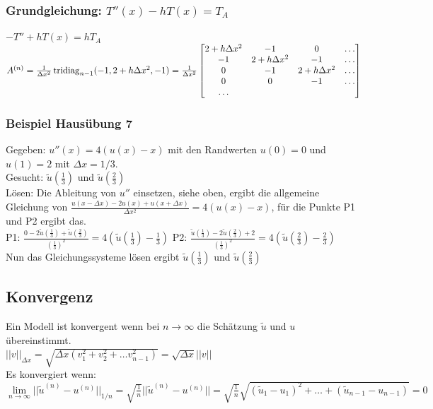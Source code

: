 \subsubsection{Grundgleichung: $T''(x) -  h T(x) = T_A$}
$-T'' + h T(x) = h T_A$\\
$A^{(n)}= \frac{1}{\Delta x^2} \operatorname{tridiag}_{n-1}
(-1,2+h\Delta x^2,-1) = \frac{1}{\Delta x^2}
  \begin{bmatrix}
             2+h\Delta x^2& -1 & 0 & \ldots \\
             -1& 2+h\Delta x^2 & -1 & \ldots \\
              0& -1 & 2+h\Delta x^2 & \ldots \\
              0& 0 & -1 & \ldots \\
             \ldots
           \end{bmatrix} $\\

\subsubsection{Beispiel Hausübung 7}
Gegeben: $ u''(x)=4(u(x)-x) $ mit den Randwerten $ u(0)=0 $  und $ u(1)=2 $ mit $\Delta x=1/3$.
\\
Gesucht: $ \tilde{u}(\frac{1}{3}) $ und $ \tilde{u}(\frac{2}{3}) $
\\
Lösen: Die Ableitung von $ u'' $ einsetzen, siehe oben, ergibt die allgemeine Gleichung von $ \frac{u(x-\Delta x)-2 u(x) + u(x+ \Delta x)}{\Delta x^2} =4 (u(x)-x) $, für die Punkte P1 und P2 ergibt das.
\\
P1: $ \frac{0-2 \tilde{u}(\frac{1}{3}) + \tilde{u}(\frac{2}{3})}{(\frac{1}{3})^2} =4(\tilde{u}(\frac{1}{3})-\frac{1}{3}) $
\qquad \qquad
P2: $ \frac{\tilde{u}(\frac{1}{3})-2 \tilde{u}(\frac{2}{3}) + 2}{(\frac{1}{3})^2} =4(\tilde{u}(\frac{2}{3})-\frac{2}{3}) $
\\
Nun das Gleichungssysteme lösen ergibt $ \tilde{u}(\frac{1}{3}) $ und $ \tilde{u}(\frac{2}{3}) $


\subsection{Konvergenz}
Ein Modell ist konvergent wenn bei $n\rightarrow\infty$ die Schätzung $\tilde{u}$ und $u$ übereinstimmt.\\

$\boxed{||v||_{\Delta x}=\sqrt{\Delta x (v_1^2+v_2^2 + \ldots v_{n-1}^2)}= \sqrt{\Delta
x}||v||}$\\
Es konvergiert wenn: $\lim\limits_{n\to \infty
}||\tilde{u}^{(n)}-u^{(n)}||_{1/n}=\sqrt{\frac{1}{n}}||\tilde{u}^{(n)}-u^{(n)}||=\sqrt{\frac{1}{n}}\sqrt{(\tilde{u}_1-u_1)^2
+ \ldots + (\tilde{u}_{n-1}-u_{n-1})}=0$\\

